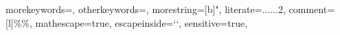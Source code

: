  {
  morekeywords={},
  otherkeywords={},
  morestring=[b]",
  literate={...}{$\ldots$}2,
  comment=[l]{\%\%},
  mathescape=true,
  escapeinside={`}{`},
  sensitive=true,
}
